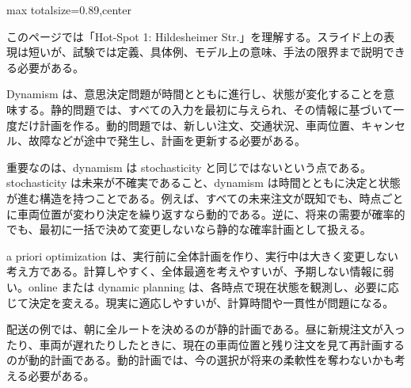 \begin{minipage}[t]{0.58\textwidth}
\begin{adjustbox}{max totalsize={\textwidth}{0.89\textheight},center}
\begin{minipage}{\textwidth}\scriptsize
{}このページでは「Hot-Spot 1: Hildesheimer Str.」を理解する。スライド上の表現は短いが、試験では定義、具体例、モデル上の意味、手法の限界まで説明できる必要がある。\par
Dynamism は、意思決定問題が時間とともに進行し、状態が変化することを意味する。静的問題では、すべての入力を最初に与えられ、その情報に基づいて一度だけ計画を作る。動的問題では、新しい注文、交通状況、車両位置、キャンセル、故障などが途中で発生し、計画を更新する必要がある。\par
重要なのは、dynamism は stochasticity と同じではないという点である。stochasticity は未来が不確実であること、dynamism は時間とともに決定と状態が進む構造を持つことである。例えば、すべての未来注文が既知でも、時点ごとに車両位置が変わり決定を繰り返すなら動的である。逆に、将来の需要が確率的でも、最初に一括で決めて変更しないなら静的な確率計画として扱える。\par
a priori optimization は、実行前に全体計画を作り、実行中は大きく変更しない考え方である。計算しやすく、全体最適を考えやすいが、予期しない情報に弱い。online または dynamic planning は、各時点で現在状態を観測し、必要に応じて決定を変える。現実に適応しやすいが、計算時間や一貫性が問題になる。\par
配送の例では、朝に全ルートを決めるのが静的計画である。昼に新規注文が入ったり、車両が遅れたりしたときに、現在の車両位置と残り注文を見て再計画するのが動的計画である。動的計画では、今の選択が将来の柔軟性を奪わないかも考える必要がある。\par

\end{minipage}
\end{adjustbox}
\end{minipage}
